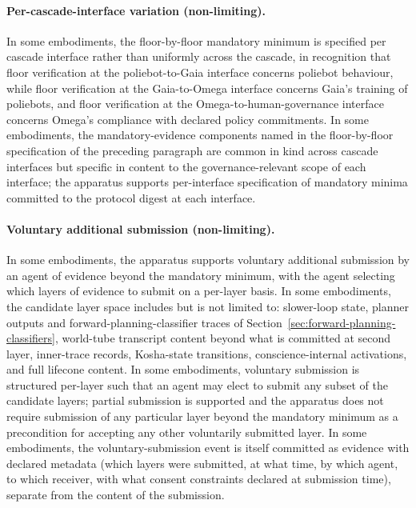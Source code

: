 \documentclass[a4paper,12pt]{article}
\begin{document}
\paragraph{Per-cascade-interface variation (non-limiting).}
In some embodiments, the floor-by-floor mandatory minimum is
specified per cascade interface rather than uniformly across the
cascade, in recognition that floor verification at the
poliebot-to-Gaia interface concerns poliebot behaviour, while floor
verification at the Gaia-to-Omega interface concerns Gaia's training
of poliebots, and floor verification at the Omega-to-human-governance
interface concerns Omega's compliance with declared policy commitments.
In some embodiments, the mandatory-evidence components named in the
floor-by-floor specification of the preceding paragraph are common
in kind across cascade interfaces but specific in content to the
governance-relevant scope of each interface; the apparatus supports
per-interface specification of mandatory minima committed to the
protocol digest at each interface.

\paragraph{Voluntary additional submission (non-limiting).}
In some embodiments, the apparatus supports voluntary additional
submission by an agent of evidence beyond the mandatory minimum,
with the agent selecting which layers of evidence to submit on a
per-layer basis. In some embodiments, the candidate layer space
includes but is not limited to: slower-loop state, planner outputs
and forward-planning-classifier traces of
Section~\ref{sec:forward-planning-classifiers}, world-tube transcript
content beyond what is committed at second layer, inner-trace
records, Kosha-state transitions, conscience-internal activations,
and full lifecone content. In some embodiments, voluntary submission
is structured per-layer such that an agent may elect to submit any
subset of the candidate layers; partial submission is supported and
the apparatus does not require submission of any particular layer
beyond the mandatory minimum as a precondition for accepting any
other voluntarily submitted layer. In some embodiments, the
voluntary-submission event is itself committed as evidence with
declared metadata (which layers were submitted, at what time, by
which agent, to which receiver, with what consent constraints
declared at submission time), separate from the content of the
submission.
\end{document}
